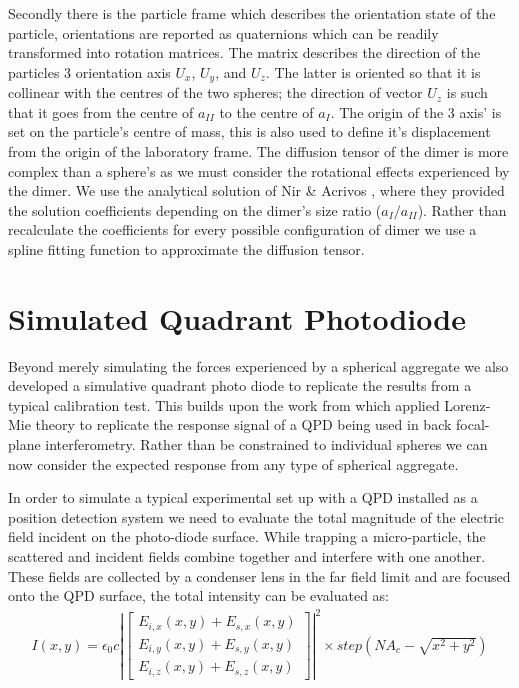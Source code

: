 Secondly there is the particle frame which describes the orientation 
state of the particle, orientations are reported as quaternions which 
can be readily transformed into rotation matrices. The matrix describes 
the direction of the particles 3 orientation axis $U_x$, $U_y$, and 
$U_z$. The latter is oriented so that it is collinear with the centres
of the two spheres; the direction of vector $U_z$ is such that it goes 
from the centre of $a_{II}$ to the centre of $a_{I}$. The origin of the 
3 axis' is set on the particle's centre of mass, this is also used to 
define it's displacement from the origin of the laboratory frame. The 
diffusion tensor of the dimer is more complex than a sphere's as we must consider the rotational effects experienced by the dimer. We use the 
analytical solution of Nir \& Acrivos \cite{Nir1973}, where they provided 
the solution coefficients depending on the dimer's size ratio 
($a_I/a_{II}$). Rather than recalculate the coefficients for every possible configuration of dimer we use a spline fitting function to approximate 
the diffusion tensor. 
\section{Simulated Quadrant Photodiode}
\label{sec:simulated_QPD}

Beyond merely simulating the forces experienced by a spherical 
aggregate we also developed a simulative quadrant photo diode 
to replicate the results from a typical calibration test. This 
builds upon the work from \cite{Rohrbach2002} which applied 
Lorenz-Mie theory to replicate the response signal of a QPD 
being used in back focal-plane interferometry. Rather than be 
constrained to individual spheres we can now consider the 
expected response from any type of spherical aggregate. 

In order to simulate a typical experimental set up with a QPD 
installed as a position detection system we need to evaluate 
the total magnitude of the electric field incident on the 
photo-diode surface. While trapping a micro-particle, the 
scattered and incident fields combine together and interfere 
with one another. These fields are collected by a condenser 
lens in the far field limit and are focused onto the QPD 
surface, the total intensity can be evaluated as:
\begin{align}
I(x,y) = \epsilon_0c\left|
\begin{bmatrix} 
	E_{i,x}(x,y)+E_{s,x}(x,y) \\ 
	E_{i,y}(x,y)+E_{s,y}(x,y) \\ 
	E_{i,z}(x,y)+E_{s,z}(x,y)
\end{bmatrix} \right|^2 \times step(NA_c-\sqrt{x^2+y^2})
\end{align}

